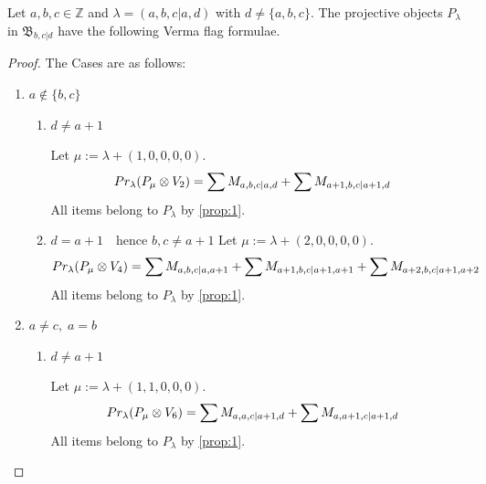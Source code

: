 \begin{theorem}
  Let $a,b,c \in \mathbb{Z}$ and $\lambda = (a,b,c|a,d)$ with $d \neq \{a,b,c\}$. The projective objects $P_{\lambda}$ in $\mathfrak{B}_{b,c|d}$ have the following Verma flag formulae.
\end{theorem}
\begin{proof} The Cases are as follows:\par
  \begin{enumerate}
  \item $ a \notin \{b,c\}$
      \begin{enumerate}
        \item $d \neq a+1$ \par
        Let $\mu:=\lambda + (1,0,0,0,0) $.
        \begin{equation}\notag
          \begin{aligned}
            Pr_{\lambda}(P_\mu \otimes V_{2}) &=
\sum M_{a,b,c|a,d}
+ \sum M_{a+1,b,c|a+1,d}
          \end{aligned}
        \end{equation}
All items belong to $P_\lambda$ by \cref{prop:1}.

\item $d = a+1\quad \text{hence } b,c \neq a+1$
        Let $\mu:=\lambda + (2,0,0,0,0) $.
        \begin{equation}\notag
          \begin{aligned}
            Pr_{\lambda}(P_\mu \otimes V_{4}) &=
\sum M_{a,b,c|a,a+1}
+ \sum M_{a+1,b,c|a+1,a+1}
+ \sum M_{a+2,b,c|a+1,a+2}
          \end{aligned}
        \end{equation}
All items belong to $P_\lambda$ by \cref{prop:1}.
      \end{enumerate}

    \item $ a \neq c,\; a=b $
      \begin{enumerate}
        \item $d \neq a+1$ \par
        Let $\mu:=\lambda + (1,1,0,0,0) $.
        \begin{equation}\notag
          \begin{aligned}
            Pr_{\lambda}(P_\mu \otimes V_{6}) &=
\sum M_{a,a,c|a+1,d}
+ \sum M_{a,a+1,c|a+1,d}
          \end{aligned}
        \end{equation}
All items belong to $P_\lambda$ by \cref{prop:1}.


\end{enumerate}
\end{enumerate}
\end{proof}
